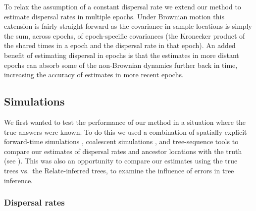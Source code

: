 \documentclass[12pt]{article}
\begin{document}
To relax the assumption of a constant dispersal rate we extend our method to estimate dispersal rates in multiple epochs. 
Under Brownian motion this extension is fairly straight-forward as the covariance in sample locations is simply the sum, across epochs, of epoch-specific covariances (the Kronecker product of the shared times in a epoch and the dispersal rate in that epoch).
An added benefit of estimating dispersal in epochs is that the estimates in more distant epochs can absorb some of the non-Brownian dynamics further back in time, increasing the accuracy of estimates in more recent epochs.

\subsection*{Simulations}

We first wanted to test the performance of our method in a situation where the true answers were known.
To do this we used a combination of spatially-explicit forward-time simulations \citep{haller2019slim}, coalescent simulations \citep{kelleher2016efficient}, and tree-sequence tools \citep{haller2019tree,kelleher2019inferring,speidel2019method} to compare our estimates of dispersal rates and ancestor locations with the truth (see ).
This was also an opportunity to compare our estimates using the true trees vs.\ the Relate-inferred trees, to examine the influence of errors in tree inference.

\subsubsection*{Dispersal rates}
\end{document}
